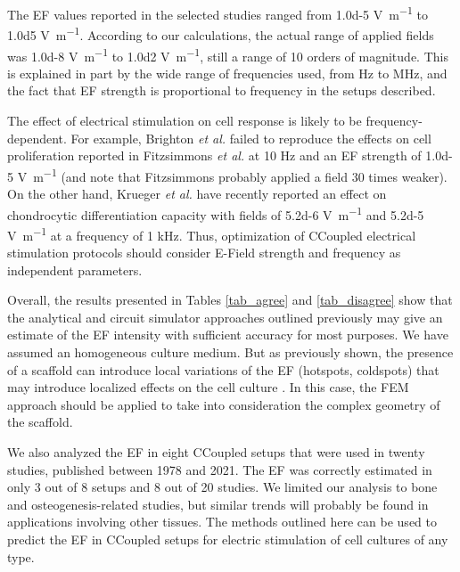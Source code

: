 The \acs{EF} values reported in the selected studies ranged from \num{1.0d-5} \si{\volt\per\meter} to \num{1.0d5} \si{\volt\per\meter}. According to our calculations, the actual range of applied fields was \num{1.0d-8} \si{\volt\per\meter} to \num{1.0d2} \si{\volt\per\meter}, still a range of 10 orders of magnitude. This is explained in part by the wide range of frequencies used, from Hz to MHz, and the fact that \acs{EF} strength is proportional to frequency in the setups described.

The effect of electrical stimulation on cell response is likely to be frequency-dependent. For example, Brighton \textit{et al.} \cite{Brighton1992-gg} failed to reproduce the effects on cell proliferation reported in Fitzsimmons \textit{et al.} \cite{Fitzsimmons1986-ks} at 10 \si{\hertz} and an \acs{EF} strength of \num{1.0d-5} \si{\volt\per\meter} (and note that Fitzsimmons probably applied a field 30 times weaker). On the other hand, Krueger \textit{et al.} \cite{Krueger2019-qk} have recently reported an effect on chondrocytic differentiation capacity with fields of \num{5.2d-6} \si{\volt\per\meter} and \num{5.2d-5} \si{\volt\per\meter} at a frequency of 1 \si{\kilo\hertz}. Thus, optimization of \acs{CCoupled} electrical stimulation protocols should consider E-Field strength and frequency as independent parameters.

Overall, the results presented in Tables \ref{tab_agree} and \ref{tab_disagree} show that the analytical and circuit simulator approaches outlined previously may give an estimate of the \acs{EF} intensity with sufficient accuracy for most purposes. We have assumed an homogeneous culture medium. But as previously shown, the presence of a scaffold can introduce local variations of the \acs{EF} (hotspots, coldspots) that may introduce localized effects on the cell culture \cite{Meneses2021-nd}. In this case, the \acs{FEM} approach should be applied to take into consideration the complex geometry of the scaffold.

We also analyzed the \acs{EF} in eight CCoupled setups that were used in twenty studies, published between 1978 and 2021. The \acs{EF} was correctly estimated in only 3 out of 8 setups and 8 out of 20 studies. We limited our analysis to bone and osteogenesis-related studies, but similar trends will probably be found in applications involving other tissues. The methods outlined here can be used to predict the \acs{EF} in CCoupled setups for electric stimulation of cell cultures of any type.     

